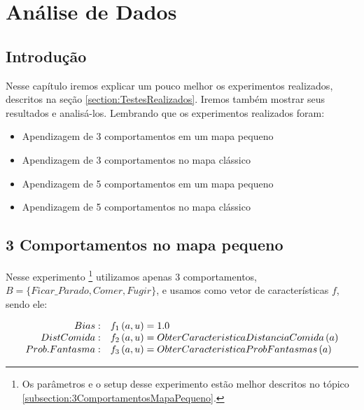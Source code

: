 


\chapter{Análise de Dados} \label{chap:Resultados}



\section{Introdução}

Nesse capítulo iremos explicar um pouco melhor os experimentos realizados, descritos na seção \ref{section:TestesRealizados}. Iremos também mostrar seus resultados e analisá-los. Lembrando que os experimentos realizados foram:

\begin{itemize}
	\item Apendizagem de 3 comportamentos em um mapa pequeno
	\item Apendizagem de 3 comportamentos no mapa clássico
	\item Apendizagem de 5 comportamentos em um mapa pequeno
	\item Apendizagem de 5 comportamentos no mapa clássico
\end{itemize}

\section{3 Comportamentos no mapa pequeno}

Nesse experimento%
\footnote{Os parâmetros e o setup desse experimento estão melhor descritos no tópico \ref{subsection:3ComportamentosMapaPequeno}.%
} utilizamos apenas 3 comportamentos, $ B = \{Ficar\_Parado, Comer, Fugir\} $, e usamos como vetor de características $ f $, sendo ele:

\begin{equation}
	\begin{array}{r l}
		Bias: & f_1 \left( a, u \right) = 1.0 \\
		Dist Comida: & f_2 \left( a, u \right) = ObterCaracteristicaDistanciaComida \left( a \right) \\
		Prob. Fantasma: & f_3 \left( a, u \right) = ObterCaracteristicaProbFantasmas \left( a \right)
	\end{array}
\end{equation}

